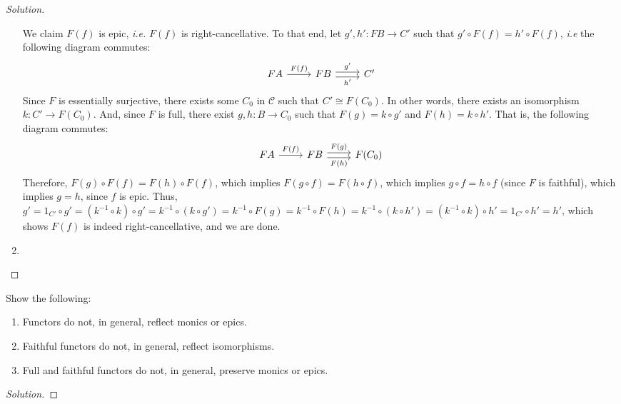 \documentclass[]{amsbook}
\newcommand{\0}{\mathbf{0}}
\newcommand{\1}{\mathbf{1}}
\newcommand{\mc}[1]{\mathcal{#1}}
\newenvironment{solution}
    {\begin{proof}[Solution]}{\end{proof}}
\begin{document}
\begin{solution}
\begin{enumerate}
    We claim $F(f)$ is epic, \emph{i.e.} $F(f)$ is right-cancellative. To that
    end, let $g', h': FB \to C'$ such that $g' \circ F(f) = h' \circ F(f)$,
    \emph{i.e} the following diagram commutes:
    \[
    \begin{tikzcd}
        FA \arrow[r, "F(f)"]
           & FB \arrow[r, shift left, "g'"]
                \arrow[r, shift right, swap, "h'"]
                & C'
    \end{tikzcd}
    \]
    Since $F$ is essentially surjective, there exists some $C_0$ in $\mc{C}$
    such that $C' \cong F(C_0)$. In other words, there exists an isomorphism
    $k: C' \to F(C_0)$. And, since $F$ is full, there exist $g, h: B \to C_0$
    such that $F(g) = k \circ g'$ and $F(h) = k \circ h'$. That is, the
    following diagram commutes:
    \[
    \begin{tikzcd}
    FA \arrow[r, "F(f)"]
       & FB \arrow[r, shift left, "F(g)"]
            \arrow[r, shift right, swap, "F(h)"]
            & F(C_0)
    \end{tikzcd}
    \]
    Therefore, $F(g) \circ F(f) = F(h) \circ F(f)$, which implies $F(g \circ f)
    = F(h \circ f)$, which implies $g \circ f = h \circ f$ (since $F$ is
    faithful), which implies $g = h$, since $f$ is epic. Thus, $g' = 1_{C'}
    \circ g' = (k^{-1} \circ k) \circ g' = k^{-1} \circ (k \circ g') = k^{-1}
    \circ F(g) = k^{-1} \circ F(h) = k^{-1} \circ (k \circ h') = (k^{-1} \circ
    k) \circ h' = 1_{C'} \circ h' = h'$, which shows $F(f)$ is indeed
    right-cancellative, and we are done.

    \item %
\end{enumerate}
\end{solution}

\begin{Exercise}
Show the following:
\begin{enumerate}
    \item Functors do not, in general, reflect monics or epics.
    \item Faithful functors do not, in general, reflect isomorphisms.
    \item Full and faithful functors do not, in general, preserve monics or
    epics.
\end{enumerate}
\end{Exercise}
\begin{solution}
\end{solution}
\end{document}
